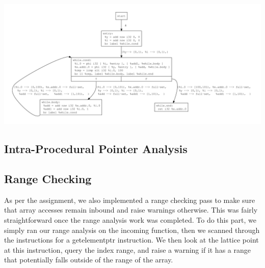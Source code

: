 \documentclass{article}
\theoremstyle{definition}
\begin{document}
\begin{center}
  \includegraphics[scale=.4]{figures/ra/loop/loop.pdf}
\end{center}
\subsection{Intra-Procedural Pointer Analysis}

\subsection{Range Checking}

As per the assignment, we also implemented a range checking pass to make sure that array accesses remain inbound and raise warnings otherwise. This was fairly straightforward once the range analysis work was completed. To do this part, we simply ran our range analysis on the incoming function, then we scanned through the instructions for a getelementptr instruction. We then look at the lattice point at this instruction, query the index range, and raise a warning if it has a range that potentially falls outside of the range of the array.
\end{document}
